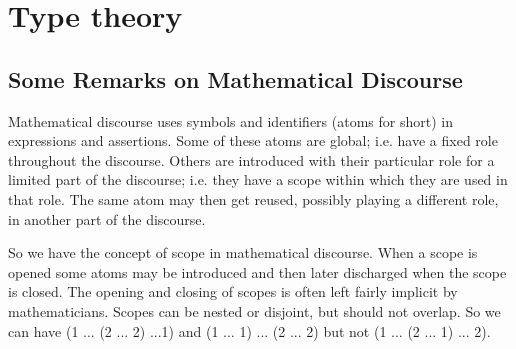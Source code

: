 \chapter{Type theory}
\label{cha:typetheory}


{%


\newcommand{\stype}{{\;\sf type}}
\newcommand{\app}{{\sf app}}
\newcommand{\inleft}{{\sf inleft}}
\newcommand{\inright}{{\sf inright}}
\newcommand{\unitt}{{\bf 1}}
\section*{Some Remarks on Mathematical Discourse}

Mathematical discourse uses symbols and identifiers (atoms for short) in expressions and assertions.  Some of these atoms are global; i.e. have a fixed role throughout the discourse.  Others are introduced with their particular role for a limited part of the discourse; i.e. they have a scope within which they are used in that role.  The same atom may then get reused, possibly playing a different role, in another part of the discourse.  

So we have the concept of scope in mathematical discourse.  When a scope is opened some atoms may be introduced and then later discharged when the scope is closed.  The opening and closing of scopes is often left fairly implicit by mathematicians.  Scopes can be nested or disjoint, but should not overlap.  So we can have (1 ... (2 ... 2) ...1) and (1 ... 1) ... (2 ... 2) but not 
(1 ... (2 ... 1) ... 2).  

}
